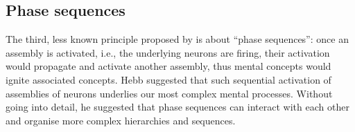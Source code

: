 
  





 

  \subsection{Phase sequences}
    The third, less known principle proposed by \cite{Hebb49} is about ``phase
    sequences'': once an assembly is activated, i.e., the underlying neurons are
    firing, their activation would propagate and activate another assembly,
    thus mental concepts would ignite associated concepts. Hebb suggested that
    such sequential activation of assemblies of neurons underlies our most
    complex mental processes. Without going into detail, he suggested that
    phase sequences can interact with each other and organise more complex
    hierarchies and sequences. 

